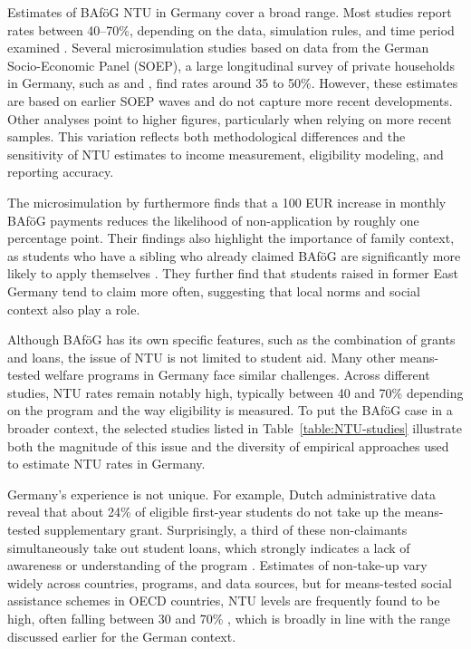 Estimates of BAföG NTU in Germany cover a broad range. Most studies report rates between 40--70\%, depending on the data, simulation rules, and time period examined \citep{goedeme_concept_2020}. Several microsimulation studies based on data from the German Socio-Economic Panel (SOEP), a large longitudinal survey of private households in Germany, such as \citet{herber_non-take-up_2019} and \citet{bruckmeier_new_2012}, find rates around 35 to 50\%. However, these estimates are based on earlier SOEP waves and do not capture more recent developments. Other analyses point to higher figures, particularly when relying on more recent samples. 
This variation reflects both methodological differences and the sensitivity of NTU estimates to income measurement, eligibility modeling, and reporting accuracy.

The microsimulation by \cite{herber_non-take-up_2019} furthermore finds that a 100 EUR increase in monthly BAföG payments reduces the likelihood of non-application by roughly one percentage point. Their findings also highlight the importance of family context, as students who have a sibling who already claimed BAföG are significantly more likely to apply themselves \citep{frick_claim_2007, bruckmeier_new_2012}. They further find that students raised in former East Germany tend to claim more often, suggesting that local norms and social context also play a role.

Although BAföG has its own specific features, such as the combination of grants and loans, the issue of NTU is not limited to student aid. Many other means-tested welfare programs in Germany face similar challenges. Across different studies, NTU rates remain notably high, typically between 40 and 70\% depending on the program and the way eligibility is measured. To put the BAföG case in a broader context, the selected studies listed in Table~\ref{table:NTU-studies} illustrate both the magnitude of this issue and the diversity of empirical approaches used to estimate NTU rates in Germany.




Germany’s experience is not unique. For example, Dutch administrative data reveal that about 24\% of eligible first-year students do not take up the means-tested supplementary grant. Surprisingly, a third of these non-claimants simultaneously take out student loans, which strongly indicates a lack of awareness or understanding of the program \citep{konijn_quantifying_2023}. Estimates of non-take-up vary widely across countries, programs, and data sources, but for means-tested social assistance schemes in OECD countries, NTU levels are frequently found to be high, often falling between 30 and 70\% \citep{goedeme_concept_2020}, which is broadly in line with the range discussed earlier for the German context.

